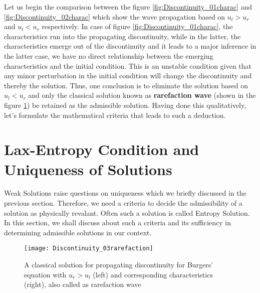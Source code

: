 \documentclass[11pt, a4paper]{report}
\begin{document}
Let us begin the comparison between the figure \ref{fig:Discontinuity_01charac} and \ref{fig:Discontinuity_02charac} 
which show the wave propagation based on $u_l > u_r$ and $u_l < u_r$ respectively. In case of figure 
\ref{fig:Discontinuity_01charac}, the characteristics run into the propagating discontinuity, while in the latter, 
the characteristics emerge out of the discontinuity and it leads to a major inference \textemdash in the latter case,
we have no direct relationship between the emerging characteristics and the initial condition. This is an unstable
condition given that any minor perturbation in the initial condition will change the discontinuity and thereby the
solution. Thus, one conclusion is to eliminate the solution based on $u_l < u_r$ and only the classical solution
known as {\bfseries rarefaction wave} (shown in the figure \ref{fig:Discontinuity_03rarefaction}) be retained as the
admissible solution. Having done this qualitatively, let's formulate the mathematical criteria that leads to such
a deduction. 

\section{Lax-Entropy Condition and Uniqueness of Solutions}
Weak Solutions raise questions on uniqueness which we briefly discussed in the previous section. Therefore, we need 
a criteria to decide the admissibility of a solution as physically revalant. Often such a solution is called 
Entropy Solution. In this section, we shall discuss about such a criteria and its sufficiency in determining
admissible solutions in our context.

\begin{figure}[h]
    \centering
    \texttt{[image: Discontinuity\_03rarefaction]}
    \caption{A classical solution for propagating discontinuity for Burgers' equation with $u_r > u_l$ (left) and corresponding characteristics (right), also called as rarefaction wave}
    \label{fig:Discontinuity_03rarefaction}
\end{figure}
\end{document}
